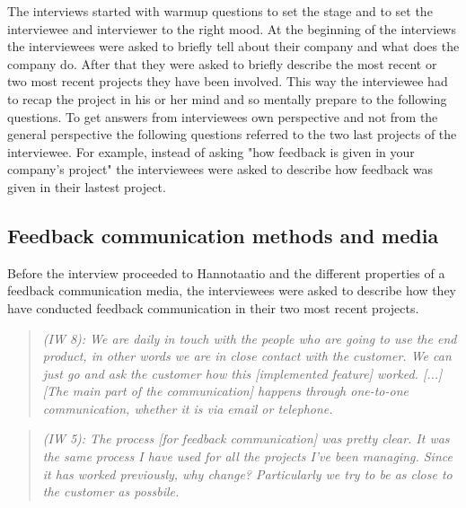 \documentclass[english,12pt,a4paper,pdftex]{article}
\newcommand{\q}[2]{
\begin{quote}
\emph{(IW #1): #2}
\end{quote}}
\begin{document}
The interviews started with warmup questions to set the stage and to set the interviewee and interviewer to the right mood. At the beginning of the interviews the interviewees were asked to briefly tell about their company and what does the company do. After that they were asked to briefly describe the most recent or two most recent projects they have been involved. This way the interviewee had to recap the project in his or her mind and so mentally prepare to the following questions. To get answers from interviewees own perspective and not from the general perspective the following questions referred to the two last projects of the interviewee. For example, instead of asking "how feedback is given in your company's project" the interviewees were asked to describe how feedback was given in their lastest project.

\subsection{Feedback communication methods and media}

Before the interview proceeded to Hannotaatio and the different properties of a feedback communication media, the interviewees were asked to describe how they have conducted feedback communication in their two most recent projects.

\q{8}{We are daily in touch with the people who are going to use the end product, in other words we are in close contact with the customer. We can just go and ask the customer how this [implemented feature] worked. [...] [The main part of the communication] happens through one-to-one communication, whether it is via email or telephone.}

\q{5}{The process [for feedback communication] was pretty clear. It was the same process I have used for all the projects I've been managing. Since it has worked previously, why change? Particularly we try to be as close to the customer as possbile.}
\end{document}
